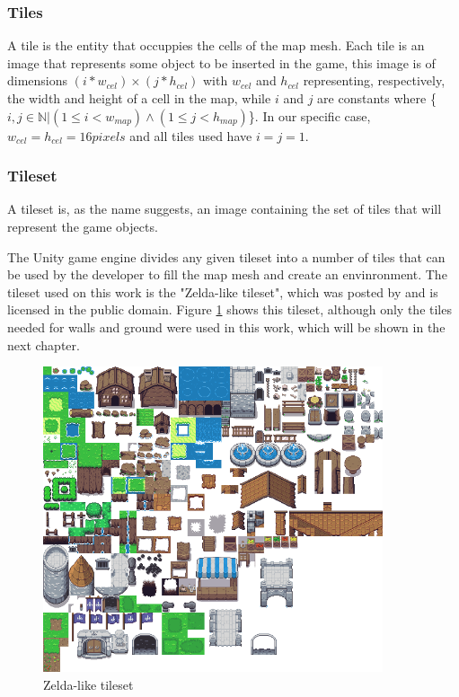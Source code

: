 \subsubsection{Tiles}

A tile is the entity that occuppies the cells of the map mesh. Each tile is an image that represents some object to be inserted in the game, this image is of dimensions \((i*w_{cel})\times(j*h_{cel})\) with \(w_{cel}\) and \(h_{cel}\) representing, respectively, the width and height of a cell in the map, while \(i\) and \(j\) are constants where \{\(i, j \in \mathbb{N}|(1\leq i<w_{map})\wedge(1\leq j<h_{map})\)\}. In our specific case, \(w_{cel}=h_{cel}=16 {pixels}\) and all tiles used have \(i=j=1\). 
\subsubsection{Tileset}

A tileset is, as the name suggests, an image containing the set of tiles that will represent the game objects.

The Unity game engine divides any given tileset into a number of tiles that can be used by the developer to fill the map mesh and create an envinronment. The tileset used on this work is the "Zelda-like tileset", which was posted by \textcite{arm:2017} and is licensed in the public domain. Figure \ref{fig:tileset} shows this tileset, although only the tiles needed for walls and ground were used in this work, which will be shown in the next chapter.

\begin{figure}[h]
    \caption{Zelda-like tileset}
    \centerline{\includegraphics[width=10cm]{images/proposal/overworld.png}}
    \label{fig:tileset}
\end{figure}

